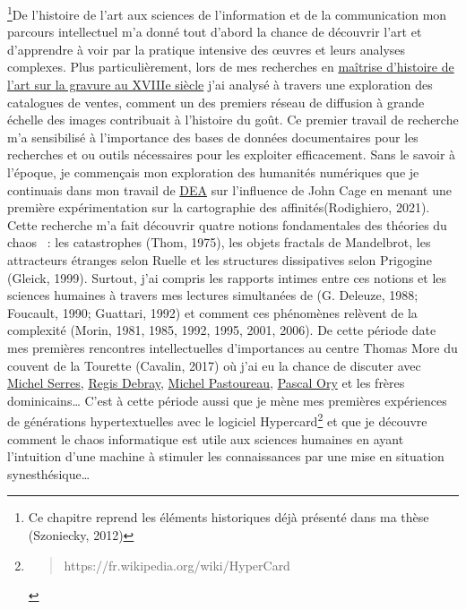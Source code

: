 \documentclass[
  a4paper,
  DIV=11,
  numbers=noendperiod]{scrreprt}
\begin{document}
\footnote{Ce chapitre reprend les éléments historiques déjà présenté
  dans ma thèse (Szoniecky, 2012)}De l'histoire de l'art aux sciences de
l'information et de la communication mon parcours intellectuel m'a donné
tout d'abord la chance de découvrir l'art et d'apprendre à voir par la
pratique intensive des œuvres et leurs analyses complexes. Plus
particulièrement, lors de mes recherches en
\href{http://localhost/samszo/omk/s/fiches/item/299343}{maîtrise
d'histoire de l'art sur la gravure au XVIIIe siècle} j'ai analysé à
travers une exploration des catalogues de ventes, comment un des
premiers réseau de diffusion à grande échelle des images contribuait à
l'histoire du goût. Ce premier travail de recherche m'a sensibilisé à
l'importance des bases de données documentaires pour les recherches et
ou outils nécessaires pour les exploiter efficacement. Sans le savoir à
l'époque, je commençais mon exploration des humanités numériques que je
continuais dans mon travail de
\href{http://localhost/samszo/omk/s/fiches/item/299342}{DEA} sur
l'influence de John Cage en menant une première expérimentation sur la
cartographie des affinités(Rodighiero, 2021). Cette recherche m'a fait
découvrir quatre notions fondamentales des théories du chaos ~: les
catastrophes (Thom, 1975), les objets fractals de Mandelbrot, les
attracteurs étranges selon Ruelle et les structures dissipatives selon
Prigogine (Gleick, 1999). Surtout, j'ai compris les rapports intimes
entre ces notions et les sciences humaines à travers mes lectures
simultanées de (G. Deleuze, 1988; Foucault, 1990; Guattari, 1992) et
comment ces phénomènes relèvent de la complexité (Morin, 1981, 1985,
1992, 1995, 2001, 2006). De cette période date mes premières rencontres
intellectuelles d'importances au centre Thomas More du couvent de la
Tourette (Cavalin, 2017) où j'ai eu la chance de discuter avec
\href{http://localhost/samszo/omk/s/fiches/item/61108}{Michel Serres},
\href{http://localhost/samszo/omk/s/fiches/item/61970}{Regis Debray},
\href{http://localhost/samszo/omk/s/fiches/item/541197}{Michel
Pastoureau},
\href{http://localhost/samszo/omk/s/fiches/item/541243}{Pascal Ory} et
les frères dominicains\ldots{} C'est à cette période aussi que je mène
mes premières expériences de générations hypertextuelles avec le
logiciel Hypercard\footnote{\begin{quote}
  https://fr.wikipedia.org/wiki/HyperCard
  \end{quote}} et que je découvre comment le chaos informatique est
utile aux sciences humaines en ayant l'intuition d'une machine à
stimuler les connaissances par une mise en situation
synesthésique\ldots{}
\end{document}
